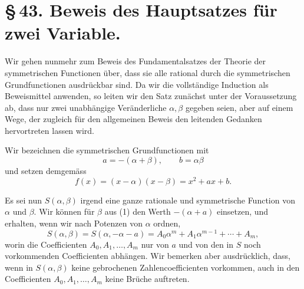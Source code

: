 \documentclass[11pt]{article}
\begin{document}
\section*{\S\,43. Beweis des Hauptsatzes für zwei Variable.}

Wir gehen nunmehr zum Beweis des Fundamentalsatzes der Theorie der symmetrischen Functionen über, dass sie alle rational durch die symmetrischen Grundfunctionen ausdrückbar sind. Da wir die vollständige Induction als Beweismittel anwenden, so leiten wir den Satz zunächst unter der Voraussetzung ab, dass nur zwei unabhängige Veränderliche $\alpha,\beta$ gegeben seien, aber auf einem Wege, der zugleich für den allgemeinen Beweis den leitenden Gedanken hervortreten lassen wird.

Wir bezeichnen die symmetrischen Grundfunctionen mit
\begin{equation}
 a=-(\alpha+\beta),\qquad b=\alpha\beta
\tag{1}
\end{equation}
und setzen demgemäss
\begin{equation}
 f(x)=(x-\alpha)(x-\beta)=x^2+ax+b.
\tag{2}
\end{equation}

Es sei nun $S(\alpha,\beta)$ irgend eine ganze rationale und symmetrische Function von $\alpha$ und $\beta$. Wir können für $\beta$ aus (1) den Werth $-(\alpha+a)$ einsetzen, und erhalten, wenn wir nach Potenzen von $\alpha$ ordnen,
\begin{equation}
 S(\alpha,\beta)=S(\alpha,-\alpha-a)=A_0\alpha^m+A_1\alpha^{m-1}+\cdots+A_m,
\tag{3}
\end{equation}
worin die Coefficienten $A_0,A_1,\ldots,A_m$ nur von $a$ und von den in $S$ noch vorkommenden Coefficienten abhängen. Wir bemerken aber ausdrücklich, dass, wenn in $S(\alpha,\beta)$ keine gebrochenen Zahlencoefficienten vorkommen, auch in den Coefficienten $A_0,A_1,\ldots,A_m$ keine Brüche auftreten.
\end{document}
